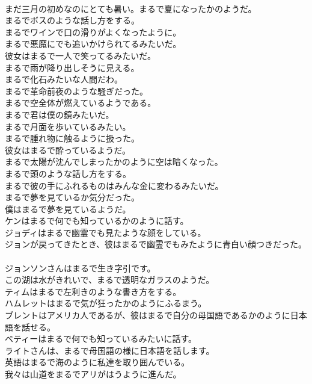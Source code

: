 \documentclass[8pt]{extreport}
\begin{document}
\begin{CJK}{UTF8}{min}
\\	まだ三月の初めなのにとても暑い。まるで夏になったかのようだ。  
\\	まるでボスのような話し方をする。   
\\	まるでワインで口の滑りがよくなったように。   
\\	まるで悪魔にでも追いかけられてるみたいだ。   
\\	彼女はまるで一人で笑ってるみたいだ。   
\\	まるで雨が降り出しそうに見える。   
\\	まるで化石みたいな人間だわ。   
\\	まるで革命前夜のような騒ぎだった。   
\\	まるで空全体が燃えているようである。   
\\	まるで君は僕の鏡みたいだ。   
\\	まるで月面を歩いているみたい。   
\\	まるで腫れ物に触るように扱った。   
\\	彼女はまるで酔っているようだ。   
\\	まるで太陽が沈んでしまったかのように空は暗くなった。   
\\	まるで頭のような話し方をする。   
\\	まるで彼の手にふれるものはみんな金に変わるみたいだ。   
\\	まるで夢を見ているか気分だった。   
\\	僕はまるで夢を見ているようだ。   
\\	ケンはまるで何でも知っているかのように話す。   
\\	ジョディはまるで幽霊でも見たような顔をしている。   
\\	ジョンが戻ってきたとき、彼はまるで幽霊でもみたように青白い顔つきだった。   
\\	ジョンソンさんはまるで生き字引です。   
\\	この湖は水がきれいで、まるで透明なガラスのようだ。  
\\	ティムはまるで左利きのような書き方をする。   
\\	ハムレットはまるで気が狂ったかのようにふるまう。   
\\	ブレントはアメリカ人であるが、彼はまるで自分の母国語であるかのように日本語を話せる。   
\\	ベティーはまるで何でも知っているみたいに話す。   
\\	ライトさんは、まるで母国語の様に日本語を話します。   
\\	英語はまるで海のように私達を取り囲んでいる。   
\\	我々は山道をまるでアリがはうように進んだ。   

\end{CJK}
\end{document}
